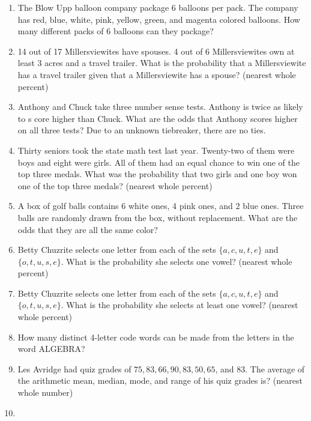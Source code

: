 \documentclass[../uilmath.tex]{subfiles}
\begin{document}
\begin{enumerate}[label=\bfseries\arabic*.]
    \item %
    The Blow Upp balloon company package 6 balloons per pack. The company has red, blue, white, pink, yellow,
    green, and magenta colored balloons. How many different packs of 6 balloons can they package?

    \item %
    14 out of 17 Millersviewites have spouses. 4 out of 6 Millersviewites own at least 3 acres and a travel trailer. What is the probability
    that a Millersviewite has a travel trailer given that a Millersviewite has a spouse? (nearest whole percent)

    \item %
    Anthony and Chuck take three number sense tests. Anthony is twice as likely to s core higher than Chuck. What are the odds that Anthony scores higher on all three tests? Due to an unknown tiebreaker, there are no ties.

    \item %
    Thirty seniors took the state math test last year. Twenty-two of them were boys and eight were girls. All of them had an equal chance to win one 
    of the top three medals. What was the probability that two girls and one boy won one of the top three medals? (nearest whole percent)

    \item %
    A box of golf balls contains 6 white ones, 4 pink ones, and 2 blue ones. Three balls are randomly drawn from the box, without replacement.
    What are the odds that they are all the same color?

    \item %
    Betty Chuzrite selects one letter from each of the sets $\{a,c,u,t,e\}$ and $\{o,t,u,s,e\}$. What is the probability she selects one vowel? (nearest whole percent)

    \item %
    Betty Chuzrite selects one letter from each of the sets $\{a,c,u,t,e\}$ and $\{o,t,u,s,e\}$. What is the probability she selects at least one vowel? (nearest whole percent) 

    \item %
    How many distinct 4-letter code words can be made from the letters in the word ALGEBRA?

    \item %
    Les Avridge had quiz grades of $75,83,66,90,83,50,65$, and $83$. The average of the arithmetic mean, median, 
    mode, and range of his quiz grades is? (nearest whole number)

    \item %
    
\end{enumerate}
\end{document}
